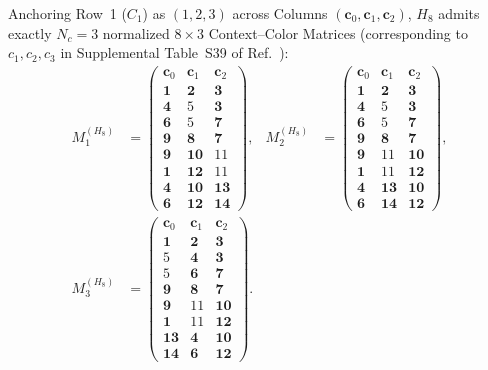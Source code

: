 \documentclass[aps,pra,reprint,superscriptaddress,longbibliography,nofootinbib,floatfix,10pt]{revtex4-2}
\theoremstyle{definition}\newtheorem{definition}[theorem]{Definition}
\theoremstyle{remark}\newtheorem{remark}[theorem]{Remark}
\begin{document}
Anchoring Row~1 ($C_1$) as $(1,2,3)$ across Columns $(\mathbf{c}_0,\mathbf{c}_1,\mathbf{c}_2)$, $H_8$ admits exactly $N_c=3$ normalized $8\times 3$ Context--Color Matrices (corresponding to $c_1,c_2,c_3$ in Supplemental Table~S39 of Ref.~\cite{supplement}):
\begin{equation}\label{eq:H8-matrices}
\begin{aligned}
M_1^{(H_8)}&=\begin{pmatrix}
\mathbf{c}_0&\mathbf{c}_1&\mathbf{c}_2\\\hline
\mathbf{1}&\mathbf{2}&\mathbf{3}\\
\mathbf{4}&5&\mathbf{3}\\
\mathbf{6}&5&\mathbf{7}\\
\mathbf{9}&\mathbf{8}&\mathbf{7}\\
\mathbf{9}&\mathbf{10}&11\\
\mathbf{1}&\mathbf{12}&11\\
\mathbf{4}&\mathbf{10}&\mathbf{13}\\
\mathbf{6}&\mathbf{12}&\mathbf{14}
\end{pmatrix},&
M_2^{(H_8)}&=\begin{pmatrix}
\mathbf{c}_0&\mathbf{c}_1&\mathbf{c}_2\\\hline
\mathbf{1}&\mathbf{2}&\mathbf{3}\\
\mathbf{4}&5&\mathbf{3}\\
\mathbf{6}&5&\mathbf{7}\\
\mathbf{9}&\mathbf{8}&\mathbf{7}\\
\mathbf{9}&11&\mathbf{10}\\
\mathbf{1}&11&\mathbf{12}\\
\mathbf{4}&\mathbf{13}&\mathbf{10}\\
\mathbf{6}&\mathbf{14}&\mathbf{12}
\end{pmatrix},\\[4pt]
M_3^{(H_8)}&=\begin{pmatrix}
\mathbf{c}_0&\mathbf{c}_1&\mathbf{c}_2\\\hline
\mathbf{1}&\mathbf{2}&\mathbf{3}\\
5&\mathbf{4}&\mathbf{3}\\
5&\mathbf{6}&\mathbf{7}\\
\mathbf{9}&\mathbf{8}&\mathbf{7}\\
\mathbf{9}&11&\mathbf{10}\\
\mathbf{1}&11&\mathbf{12}\\
\mathbf{13}&\mathbf{4}&\mathbf{10}\\
\mathbf{14}&\mathbf{6}&\mathbf{12}
\end{pmatrix}.
\end{aligned}
\end{equation}
\end{document}
